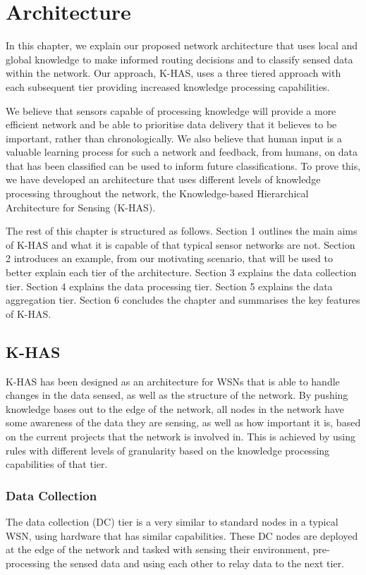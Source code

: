 \chapter{Architecture}\label{chap:arch}
	In this chapter, we explain our proposed network architecture that uses local and global knowledge to make informed routing decisions and to classify sensed data within the network. Our approach, K-HAS, uses a three tiered approach with each subsequent tier providing increased knowledge processing capabilities. 

	We believe that sensors capable of processing knowledge will provide a more efficient network and be able to prioritise data delivery that it believes to be important, rather than chronologically. We also believe that human input is a valuable learning process for such a network and feedback, from humans, on data that has been classified can be used to inform future classifications. To prove this, we have developed an architecture that uses different levels of knowledge processing throughout the network, the Knowledge-based Hierarchical Architecture for Sensing (K-HAS).

	The rest of this chapter is structured as follows. Section 1 outlines the main aims of K-HAS and what it is capable of that typical sensor networks are not. Section 2 introduces an example, from our motivating scenario, that will be used to better explain each tier of the architecture. Section 3 explains the data collection tier. Section 4 explains the data processing tier. Section 5 explains the data aggregation tier. Section 6 concludes the chapter and summarises the key features of K-HAS.

	\section{K-HAS}
		K-HAS has been designed as an architecture for WSNs that is able to handle changes in the data sensed, as well as the structure of the network. By pushing knowledge bases out to the edge of the network, all nodes in the network have some awareness of the data they are sensing, as well as how important it is, based on the current projects that the network is involved in. This is achieved by using rules with different levels of granularity based on the knowledge processing capabilities of that tier.
	
	\subsection{Data Collection}\label{khas:dc}
	The data collection (DC) tier is a very similar to standard nodes in a typical WSN, using hardware that has similar capabilities. These DC nodes are deployed at the edge of the network and tasked with sensing their environment, pre-processing the sensed data and using each other to relay data to the next tier.

